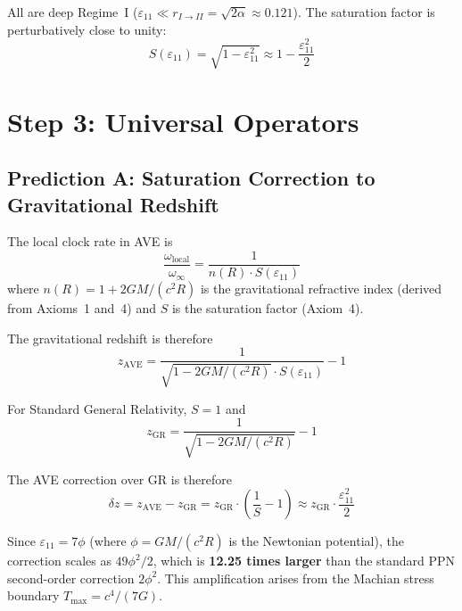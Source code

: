 All are deep Regime~I ($\varepsilon_{11} \ll r_{I \to II} = \sqrt{2\alpha} \approx 0.121$).
The saturation factor is perturbatively close to unity:
\begin{equation}
    S(\varepsilon_{11}) = \sqrt{1 - \varepsilon_{11}^2} \approx 1 - \frac{\varepsilon_{11}^2}{2}
\end{equation}

\section{Step 3: Universal Operators}

\subsection{Prediction A: Saturation Correction to Gravitational Redshift}

The local clock rate in AVE is
\begin{equation}
    \frac{\omega_{\text{local}}}{\omega_\infty} = \frac{1}{n(R) \cdot S(\varepsilon_{11})}
\end{equation}
where $n(R) = 1 + 2GM/(c^2 R)$ is the gravitational refractive index (derived from Axioms~1 and~4)
and $S$ is the saturation factor (Axiom~4).

The gravitational redshift is therefore
\begin{equation}
    z_{\text{AVE}} = \frac{1}{\sqrt{1 - 2GM/(c^2 R)} \cdot S(\varepsilon_{11})} - 1
\end{equation}

For Standard General Relativity, $S = 1$ and
\begin{equation}
    z_{\text{GR}} = \frac{1}{\sqrt{1 - 2GM/(c^2 R)}} - 1
\end{equation}

The AVE correction over GR is therefore
\begin{equation}
    \delta z = z_{\text{AVE}} - z_{\text{GR}} = z_{\text{GR}} \cdot \left(\frac{1}{S} - 1\right) \approx z_{\text{GR}} \cdot \frac{\varepsilon_{11}^2}{2}
\end{equation}

Since $\varepsilon_{11} = 7\phi$ (where $\phi = GM/(c^2 R)$ is the Newtonian potential),
the correction scales as $49\phi^2/2$, which is \textbf{12.25 times larger} than the
standard PPN second-order correction $2\phi^2$.
This amplification arises from the Machian stress boundary $T_{\max} = c^4/(7G)$.

